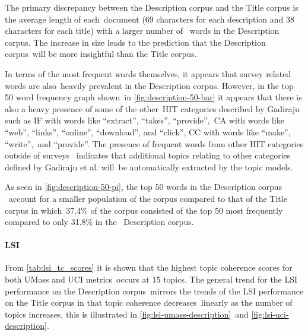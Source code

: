 \documentclass[letterpaper,12pt]{article}
\begin{document}
The primary discrepancy between the Description corpus and the Title corpus is the average length of each\
document (69 characters for each description and 38 characters for each title) with a larger number of \
words in the Description corpus. The increase in size leads to the prediction that the Description corpus\
will be more insightful than the Title corpus.

In terms of the most frequent words themselves, it appears that survey related words are also\
heavily prevalent in the Description corpus. However, in the top 50 word frequency graph shown\
in \ref{fig:description-50-bar} it appears that there is also a heavy presence of some of the other\
HIT categories described by Gadiraju such as IF with words like ``extract'', ``takes'', ``provide'',\
CA with words like ``web'', ``links'', ``online'', ``download'', and ``click'', CC with words like ``make'', ``write'',\
and ``provide''. The presence of frequent words from other HIT categories outside of surveys \
indicates that additional topics relating to other categories defined by Gadiraju et al. will\
be automatically extracted by the topic models.

As seen in \ref{fig:description-50-pi}, the top 50 words in the Description corpus \
account for a smaller population of the corpus compared to that of the Title corpus in which\
37.4\% of the corpus consisted of the top 50 most frequently compared to only 31.8\% in the \
Description corpus.

\newpage
\paragraph{LSI}
From \ref{tab:lsi_tc_scores} it is shown that the highest topic coherence scores for both UMass and UCI metrics\
occurs at 15 topics. The general trend for the LSI performance on the Description corpus\
mirrors the trends of the LSI performance on the Title corpus in that topic coherence decreases\
linearly as the number of topics increases, this is illustrated in \ref{fig:lsi-umass-description}\
and \ref{fig:lsi-uci-description}.
\end{document}
